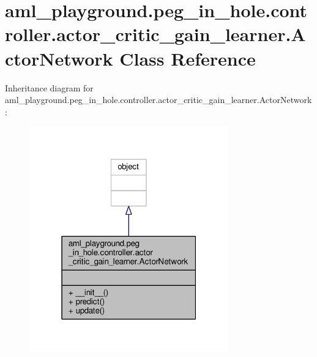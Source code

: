 \hypertarget{classaml__playground_1_1peg__in__hole_1_1controller_1_1actor__critic__gain__learner_1_1_actor_network}{\section{aml\-\_\-playground.\-peg\-\_\-in\-\_\-hole.\-controller.\-actor\-\_\-critic\-\_\-gain\-\_\-learner.\-Actor\-Network Class Reference}
\label{classaml__playground_1_1peg__in__hole_1_1controller_1_1actor__critic__gain__learner_1_1_actor_network}
}


Inheritance diagram for aml\-\_\-playground.\-peg\-\_\-in\-\_\-hole.\-controller.\-actor\-\_\-critic\-\_\-gain\-\_\-learner.\-Actor\-Network\-:\nopagebreak
\begin{figure}[H]
\begin{center}
\leavevmode
\includegraphics[width=244pt]{classaml__playground_1_1peg__in__hole_1_1controller_1_1actor__critic__gain__learner_1_1_actor_network__inherit__graph}
\end{center}
\end{figure}


